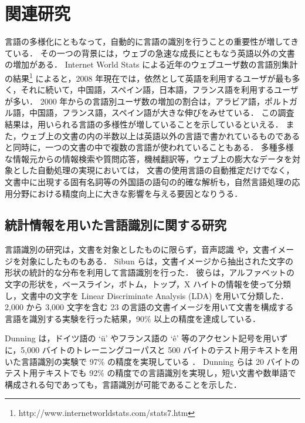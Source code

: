 \documentclass[japanese]{jnlp_1.4}
\begin{document}
\section{関連研究}
\label{sec:related-work}

言語の多様化にともなって，自動的に言語の識別を行うことの重要性が増してきている．
その一つの背景には，ウェブの急速な成長にともなう英語以外の文書の増加がある．
Internet World Stats による近年のウェブユーザ数の言語別集計の結果\footnote{http://www.internetworldstats.com/stats7.htm} によると，2008 年現在では，依然として英語を利用するユーザが最も多く，それに続いて，中国語，スペイン語，日本語，フランス語を利用するユーザが多い．
2000 年からの言語別ユーザ数の増加の割合は，アラビア語，ポルトガル語，中国語，フランス語，スペイン語が大きな伸びをみせている．
この調査結果は，用いられる言語の多様性が増していることを示しているといえる．
また，ウェブ上の文書の内の半数以上は英語以外の言語で書かれているものであると同時に，一つの文書の中で複数の言語が使われていることもある．
多種多様な情報元からの情報検索や質問応答，機械翻訳等，ウェブ上の膨大なデータを対象とした自動処理の実現においては，
文書の使用言語の自動推定だけでなく，文書中に出現する固有名詞等の外国語の語句の的確な解析も，自然言語処理の応用分野における精度向上に大きな影響を与える要因となりうる．


\subsection{統計情報を用いた言語識別に関する研究}
\label{sec:language-identification}

言語識別の研究は，文書を対象としたものに限らず，音声認識 \cite{matrouf98,berkling94} や，文書イメージを対象にしたものもある．
Sibun らは，文書イメージから抽出された文字の形状の統計的な分布を利用して言語識別を行った\cite{Sibun94}．
彼らは，アルファベットの文字の形状を，ベースライン，ボトム，トップ，X ハイトの情報を使って分類し，文書中の文字を Linear Discriminate Analysis (LDA) を用いて分類した．
2,000 から 3,000 文字を含む 23 の言語の文書イメージを用いて文書を構成する言語を識別する実験を行った結果，90\% 以上の精度を達成している．

Dunning は，ドイツ語の `\"u' やフランス語の `\^e' 等のアクセント記号を用いずに，5,000 バイトのトレーニングコーパスと 500 バイトのテスト用テキストを用いた言語識別の実験で 97\% の精度を実現している \cite{dunning94}．
Dunning らは 20 バイトのテスト用テキストでも 92\% の精度での言語識別を実現し，短い文書や数単語で構成される句であっても，言語識別が可能であることを示した．
\end{document}
